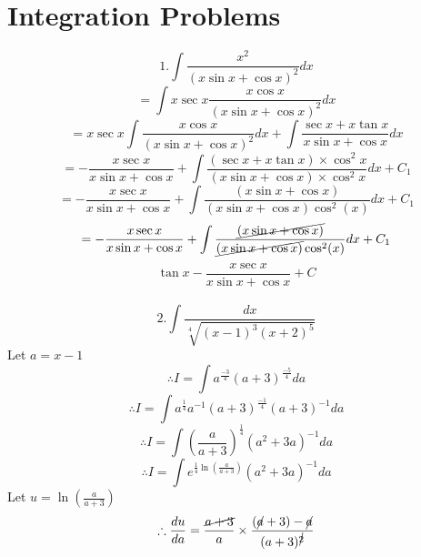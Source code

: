 \documentclass[14pt]{article}
\begin{document}
	\section{Integration Problems}
	\begin{equation*}
		1. \int \frac{x^2}{(x\sin x+\cos x)^2}dx
	\end{equation*}
	\begin{equation*}
		=\int x \sec x \frac{x \cos x}{(x\sin x+\cos x)^2}dx
	\end{equation*}
	\begin{equation*}
		=x \sec x \int \frac{x \cos x}{(x\sin x+\cos x)^2}dx + \int \frac{\sec x+x\tan x}{x\sin x+\cos x}dx
	\end{equation*}
	\begin{equation*}
		=-\frac{x\sec x}{x\sin x+\cos x}+\int\frac{(\sec x+x\tan x)\times\cos^2 x}{(x\sin x+\cos x)\times\cos^2 x}dx+C_1
	\end{equation*}
	\begin{equation*}
		=-\frac{x\sec x}{x\sin x+\cos x}+\int\frac{(x\sin x+\cos x)}{(x\sin x+\cos x)\cos^2(x)}dx+C_1
	\end{equation*}
	\begin{equation*}
		=-\frac{x\sec x}{x\sin x+\cos x}+\int\frac{\cancel{(x\sin x+\cos x)}}{\cancel{(x\sin x+\cos x)}\cos^2(x)}dx+C_1
	\end{equation*}
	\begin{equation*}
		\boxed{\tan x -\frac{x\sec x}{x\sin x+\cos x}+C}
	\end{equation*}
	\\ \begin{equation*}
		2.\int \frac{dx}{\sqrt[4]{(x-1)^3(x+2)^5}}
	\end{equation*}
	Let $a=x-1$
	\begin{equation*}
		\therefore I = \int a^{\frac{-3}{4}} (a+3)^{\frac{-5}{4}}da
	\end{equation*}
	\begin{equation*}
		\therefore I = \int a^{\frac{1}{4}} a^{-1} (a+3)^{\frac{-1}{4}} (a+3)^{-1}da
	\end{equation*}
	\begin{equation*}
		\therefore I = \int (\frac{a}{a+3})^{\frac{1}{4}} (a^2+3a)^{-1}da
	\end{equation*}
	\begin{equation*}
		\therefore I = \int e^{\frac{1}{4}\ln(\frac{a}{a+3})} (a^2+3a)^{-1}da
	\end{equation*}
	Let $u=\ln(\frac{a}{a+3})$
	\\ \begin{equation*}
		\therefore \frac{du}{da} = \frac{\cancel{a+3}}{a}\times\frac{(\cancel{a}+3)-\cancel{a}}{(a+3)^{\cancel{2}}}
	\end{equation*}
\end{document}
